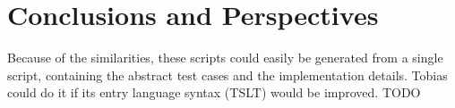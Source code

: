 \documentclass{chi-ext}
\begin{document}
\section{Conclusions and Perspectives}
Because of the similarities, these scripts could easily be generated from a single script, containing the abstract test cases and the implementation details. Tobias could do it if its entry language syntax (TSLT) would be improved.
TODO

\balance


\end{document}
